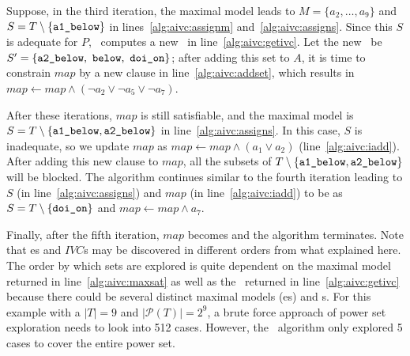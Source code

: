 Suppose, in the third iteration, the maximal model leads to $M = \{a_2, \ldots, a_9\}$ and
$S = T \setminus \{ {\small \texttt{a1\_below}}\} $ in lines~\ref{alg:aivc:assignm} and~\ref{alg:aivc:assigns}.
Since this $S$ is adequate for $P$, \getivc ~computes a new \mivc\ in line~\ref{alg:aivc:getivc}.
Let the new \mivc\ be $S' = \{ {\small \texttt{a2\_below},~\texttt{below}, ~\texttt{doi\_on}}\}$; after adding this set to $A$,
it is time to constrain $map$ by a new clause in line~\ref{alg:aivc:addset},
which results in $map \leftarrow map \wedge (\neg a_2 \vee \neg a_5 \vee \neg a_7)$.

After these iterations, $map$ is still satisfiable, and the maximal model is
 $S = T \setminus \{ { \small \texttt{a1\_below}}, { \small \texttt{a2\_below}}\}$ in line~\ref{alg:aivc:assigns}.
In this case, $S$ is inadequate, so we update $map$ as
$map \leftarrow map \wedge (a_1 \vee a_2)$ (line~\ref{alg:aivc:iadd}). After adding this new clause to $map$,
all the subsets of $T \setminus \{ { \small \texttt{a1\_below}}, {\small \texttt{a2\_below}}\}$
will be blocked. The algorithm continues similar to the fourth iteration leading to $S$ (in line~\ref{alg:aivc:assigns}) and $map$ (in line~\ref{alg:aivc:iadd}) to be as
 $S = T \setminus \{ {\small  \texttt{doi\_on}}\}$ and $map \leftarrow map \wedge a_7$.

Finally, after the fifth iteration, $map$ becomes \unsat and the algorithm terminates.
Note that \mis es and $IVC$s may be discovered in different orders from what explained here. The order by which sets are explored is
quite dependent on the maximal model returned in line~\ref{alg:aivc:maxsat} as well as the \mivc\ returned in line~\ref{alg:aivc:getivc} because there could be several distinct maximal models (\mis es) and \mivc s. For this example with a $|T| = 9$ and $|\mathcal{P}(T)| = 2^9$, a brute force approach of power set exploration needs to look into 512  cases. However, the \aivcalg ~algorithm only explored 5 cases to cover the entire power set. %




